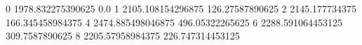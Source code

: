 0 1978.832275390625 0.0
1 2105.108154296875 126.27587890625
2 2145.177734375 166.345458984375
4 2474.885498046875 496.05322265625
6 2288.591064453125 309.7587890625
8 2205.57958984375 226.747314453125
